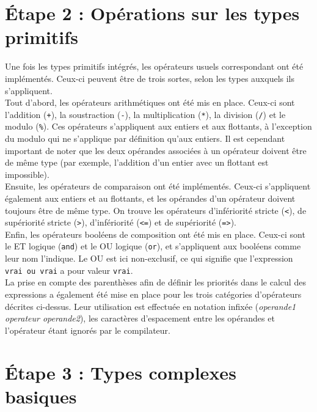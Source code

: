 \documentclass[a4paper, 12pt]{report}
\begin{document}
\chapter{\'Etape 2 : Opérations sur les types primitifs}

	Une fois les types primitifs intégrés, les opérateurs usuels correspondant ont été implémentés. Ceux-ci peuvent être de trois sortes, selon les types auxquels ils s'appliquent.\\
	
	Tout d'abord, les opérateurs arithmétiques ont été mis en place. Ceux-ci sont l'addition (\texttt{+}), la soustraction (\texttt{-}), la multiplication (\texttt{*}), la division (\texttt{/}) et le modulo (\texttt{\%}). Ces opérateurs s'appliquent aux entiers et aux flottants, à l'exception du modulo qui ne s'applique par définition qu'aux entiers. Il est cependant important de noter que les deux opérandes associées à un opérateur doivent être de même type (par exemple, l'addition d'un entier avec un flottant est impossible).\\

	Ensuite, les opérateurs de comparaison ont été  implémentés. Ceux-ci s'appliquent également aux entiers et au flottants, et les opérandes d'un opérateur doivent toujours être de même type. On trouve les opérateurs d'infériorité stricte (\texttt{<}), de supériorité stricte (\texttt{>}), d'infériorité (\texttt{<=}) et de supériorité (\texttt{=>}).\\
	
	Enfin, les opérateurs booléens de composition ont été mis en place. Ceux-ci sont le ET logique (\texttt{and}) et le OU logique (\texttt{or}), et s'appliquent aux booléens comme leur nom l'indique. Le OU est ici non-exclusif, ce qui signifie que l'expression \texttt{vrai ou vrai} a pour valeur \texttt{vrai}.\\
	
	La prise en compte des parenthèses afin de définir les priorités dans le calcul des expressions a également été mise en place pour les trois catégories d'opérateurs décrites ci-dessus. Leur utilisation est effectuée en notation infixée (\textit{operande1 operateur operande2}), les caractères d'espacement entre les opérandes et l'opérateur étant ignorés par le compilateur.
    
\chapter{\'Etape 3 : Types complexes basiques}
\end{document}
